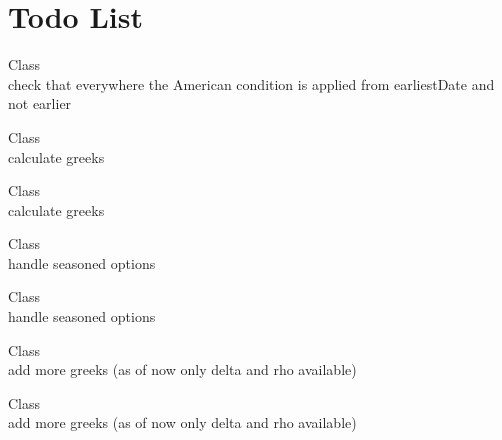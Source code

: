 \chapter{Todo List}
\hypertarget{todo}{}\label{todo}

\begin{DoxyRefList}
\item[Class \doxylink{class_quant_lib_1_1_american_exercise}{Quant\+Lib\+::American\+Exercise} ]\hfill \\
\label{todo__todo000003}%
%
check that everywhere the American condition is applied from earliest\+Date and not earlier  
\item[Class \doxylink{class_quant_lib_1_1_american_payoff_at_expiry}{Quant\+Lib\+::American\+Payoff\+At\+Expiry} ]\hfill \\
\label{todo__todo000059}%
%
calculate greeks  
\item[Class \doxylink{class_quant_lib_1_1_american_payoff_at_hit}{Quant\+Lib\+::American\+Payoff\+At\+Hit} ]\hfill \\
\label{todo__todo000060}%
%
calculate greeks  
\item[Class \doxylink{class_quant_lib_1_1_analytic_continuous_geometric_average_price_asian_engine}{Quant\+Lib\+::Analytic\+Continuous\+Geometric\+Average\+Price\+Asian\+Engine} ]\hfill \\
\label{todo__todo000061}%
%
handle seasoned options  
\item[Class \doxylink{class_quant_lib_1_1_analytic_continuous_geometric_average_price_asian_heston_engine}{Quant\+Lib\+::Analytic\+Continuous\+Geometric\+Average\+Price\+Asian\+Heston\+Engine} ]\hfill \\
\label{todo__todo000004}%
%
handle seasoned options  
\item[Class \doxylink{class_quant_lib_1_1_analytic_digital_american_engine}{Quant\+Lib\+::Analytic\+Digital\+American\+Engine} ]\hfill \\
\label{todo__todo000064}%
%
add more greeks (as of now only delta and rho available) 
\item[Class \doxylink{class_quant_lib_1_1_analytic_digital_american_k_o_engine}{Quant\+Lib\+::Analytic\+Digital\+American\+KOEngine} ]\hfill \\
\label{todo__todo000065}%
%
add more greeks (as of now only delta and rho available) 

\end{DoxyRefList}

